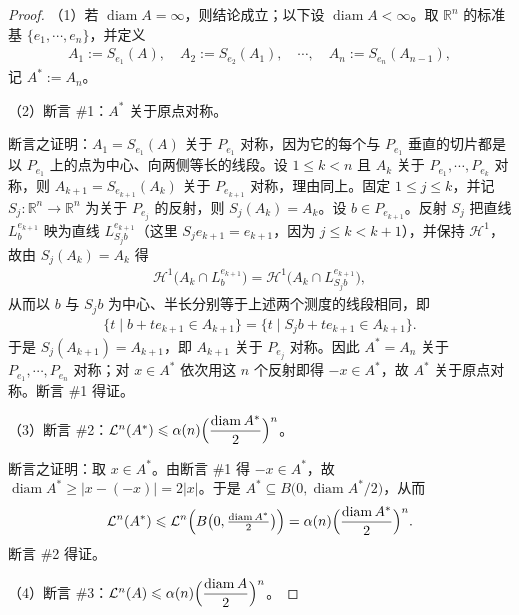 \documentclass[../../main.tex]{subfiles}%
\begin{document}
\begin{proof}
（1）若 $\operatorname{diam}A=\infty$，则结论成立；以下设 $\operatorname{diam}A<\infty$。取 $\mathbb{R}^n$ 的标准基 $\{e_1,\cdots,e_n\}$，并定义
\begin{align*}
A_1:=S_{e_1}(A),\quad A_2:=S_{e_2}(A_1),\quad \cdots,\quad A_n:=S_{e_n}(A_{n-1}),
\end{align*}
记 $A^*:=A_n$。

（2）断言 \#1：$A^*$ 关于原点对称。

断言之证明：$A_1=S_{e_1}(A)$ 关于 $P_{e_1}$ 对称，因为它的每个与 $P_{e_1}$ 垂直的切片都是以 $P_{e_1}$ 上的点为中心、向两侧等长的线段。设 $1\leqslant k<n$ 且 $A_k$ 关于 $P_{e_1},\cdots,P_{e_k}$ 对称，则 $A_{k+1}=S_{e_{k+1}}(A_k)$ 关于 $P_{e_{k+1}}$ 对称，理由同上。固定 $1\leqslant j\leqslant k$，并记 $S_j:\mathbb{R}^n\to\mathbb{R}^n$ 为关于 $P_{e_j}$ 的反射，则 $S_j(A_k)=A_k$。设 $b\in P_{e_{k+1}}$。反射 $S_j$ 把直线 $L_b^{e_{k+1}}$ 映为直线 $L_{S_jb}^{e_{k+1}}$（这里 $S_je_{k+1}=e_{k+1}$，因为 $j\leqslant k<k+1$），并保持 $\mathcal{H}^1$，故由 $S_j(A_k)=A_k$ 得
\begin{align*}
\mathcal{H}^1\bigl(A_k\cap L_b^{e_{k+1}}\bigr)=\mathcal{H}^1\bigl(A_k\cap L_{S_jb}^{e_{k+1}}\bigr),
\end{align*}
从而以 $b$ 与 $S_jb$ 为中心、半长分别等于上述两个测度的线段相同，即
\begin{align*}
\bigl\{t\mid b+te_{k+1}\in A_{k+1}\bigr\}=\bigl\{t\mid S_jb+te_{k+1}\in A_{k+1}\bigr\}.
\end{align*}
于是 $S_j(A_{k+1})=A_{k+1}$，即 $A_{k+1}$ 关于 $P_{e_j}$ 对称。因此 $A^*=A_n$ 关于 $P_{e_1},\cdots,P_{e_n}$ 对称；对 $x\in A^*$ 依次用这 $n$ 个反射即得 $-x\in A^*$，故 $A^*$ 关于原点对称。断言 \#1 得证。

（3）断言 \#2：$\mathcal{L}^n(A^*)\leqslant\alpha(n)\Bigl(\dfrac{\operatorname{diam}A^*}{2}\Bigr)^n$。

断言之证明：取 $x\in A^*$。由断言 \#1 得 $-x\in A^*$，故 $\operatorname{diam}A^*\geqslant|x-(-x)|=2|x|$。于是 $A^*\subseteq B\bigl(0,\operatorname{diam}A^*/2\bigr)$，从而
\begin{align*}
\mathcal{L}^n(A^*)\leqslant\mathcal{L}^n\Bigl(B\bigl(0,\tfrac{\operatorname{diam}A^*}{2}\bigr)\Bigr)=\alpha(n)\Bigl(\frac{\operatorname{diam}A^*}{2}\Bigr)^n .
\end{align*}
断言 \#2 得证。

（4）断言 \#3：$\mathcal{L}^n(A)\leqslant\alpha(n)\Bigl(\dfrac{\operatorname{diam}A}{2}\Bigr)^n$。


\end{proof}
\end{document}
